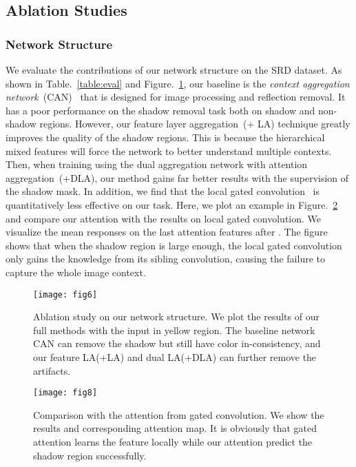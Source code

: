 \documentclass[letterpaper]{article} \usepackage{aaai20}  \usepackage{times}  \usepackage{helvet} \usepackage{courier}  \usepackage[hyphens]{url}  \urlstyle{rm} \def\UrlFont{\rm}  \usepackage{graphicx}  \frenchspacing  \setlength{\pdfpagewidth}{8.5in}  \setlength{\pdfpageheight}{11in}  \usepackage{amssymb}
\begin{document}
\subsection{Ablation Studies}	
\subsubsection{Network Structure}
We evaluate the contributions of our network structure on the SRD dataset. As shown in Table.~\ref{table:eval} and Figure.~\ref{fig:ablation}, our baseline is the \textit{context aggregation network}~(CAN)~\cite{2018arXiv180605376Z} that is designed for image processing and reflection removal. It has a poor performance on the shadow removal task both on shadow and non-shadow regions. However, our feature layer aggregation~(+ LA) technique greatly improves the quality of the shadow regions. This is because the hierarchical mixed features will force the network to better understand multiple contexts. Then, when training using the dual aggregation network with attention aggregation~(+DLA), our method gains far better results with the supervision of the shadow mask. In addition, we find that the local gated convolution~\cite{yu2018free} is quantitatively less effective on our task. Here, we plot an example in Figure.~\ref{fig:gated} and compare our attention with the results on local gated convolution. 
We visualize the mean responses on the last attention features after . The figure shows that when the shadow region is large enough, the local gated convolution only gains the knowledge from its sibling convolution, causing the failure to capture the whole image context. 


\begin{figure}[t]
 \centering
  \texttt{[image: fig6]}
  \caption{Ablation study on our network structure. We plot the results of our full methods with the input in yellow region. The baseline network CAN can remove the shadow but still have color in-consistency, and our feature LA(+LA) and dual LA(+DLA) can further remove the artifacts.}
  \label{fig:ablation}
\end{figure}

\begin{figure}[t]
 \centering
  \texttt{[image: fig8]}
  \caption{Comparison with the attention from gated convolution. We show the results and corresponding attention map. It is obviously that gated attention learns the feature locally while our attention predict the shadow region successfully.}
  \label{fig:gated}
\end{figure}
\end{document}
